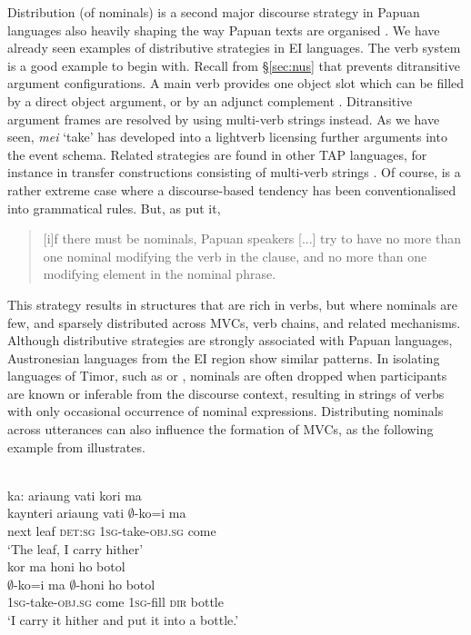 Distribution (of nominals) is a second major discourse strategy in Papuan languages also heavily shaping the way Papuan texts are organised \citep{devries2005towards, devries2006areal}. We have already seen examples of distributive strategies in EI languages. The  verb system is a good example to begin with. Recall from §\ref{sec:nus} that  prevents ditransitive argument configurations. A main verb provides one object slot which can be filled by a direct object argument, or by an adjunct complement \citep{huber2011}. Ditransitive argument frames are resolved by using multi-verb strings instead. As we have seen, \textit{mei} `take' has developed into a lightverb licensing further arguments into the event schema. Related strategies are found in other TAP languages, for instance in transfer constructions consisting of multi-verb strings \citep{klamer2012development}. Of course,  is a rather extreme case where a discourse-based tendency has been conventionalised into grammatical rules. But, as \citet[813]{devries2006areal} put it, \begin{quote}[i]f there must be nominals, Papuan speakers [...] try to have no more than one nominal modifying the verb in the clause, and no more than one modifying element in the nominal phrase.\end{quote} This strategy results in structures that are rich in verbs, but where nominals are few, and sparsely distributed across MVCs, verb chains, and related mechanisms. Although distributive strategies are strongly associated with Papuan languages, Austronesian languages from the EI region show similar patterns. In isolating languages of Timor, such as  or , nominals are often dropped when participants are known or inferable from the discourse context, resulting in strings of verbs with only occasional occurrence of nominal expressions. Distributing nominals across utterances can also influence the formation of MVCs, as the following example from  illustrates.

\ea \label{Wooi_leaf}
\\
\ea
\glll ka: ariaung vati kori ma \\
kaynteri ariaung vati $\emptyset$-ko=i ma \\
next leaf \textsc{det}:\textsc{sg} \textsc{1}\textsc{sg}-take-\textsc{obj}.\textsc{sg} come \\
\glft `The leaf, I carry hither' \\
\ex
\glll kor ma honi ho botol \\
$\emptyset$-ko=i ma $\emptyset$-honi ho botol \\
\textsc{1}\textsc{sg}-take-\textsc{obj}.\textsc{sg} come \textsc{1}\textsc{sg}-fill \textsc{dir} bottle \\
\glft `I carry it hither and put it into a bottle.'\\
\z
\z

